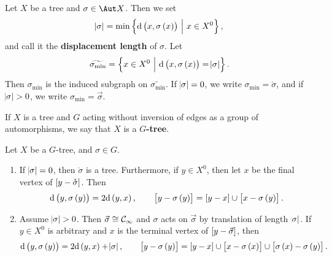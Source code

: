 \pagebreak

\begin{definition}
Let $ X $ be a tree and $ \sigma \in \Aut X $. Then we set
$$ \abs{\sigma} = \min\cbr{\d\br{x, \sigma\br{x}} \st x \in X^0}, $$
and call it the \textbf{displacement length} of $ \sigma $. Let
$$ \widetilde{\sigma_{\min}} = \cbr{x \in X^0 \st \d\br{x, \sigma\br{x}} = \abs{\sigma}}. $$
Then $ \sigma_{\min} $ is the induced subgraph on $ \widetilde{\sigma_{\min}} $. If $ \abs{\sigma} = 0 $, we write $ \sigma_{\min} = \mathring{\sigma} $, and if $ \abs{\sigma} > 0 $, we write $ \sigma_{\min} = \vec{\sigma} $.
\end{definition}


\begin{definition}
If $ X $ is a tree and $ G $ acting without inversion of edges as a group of automorphisms, we say that $ X $ is a \textbf{$ G $-tree}.
\end{definition}

\begin{proposition}
Let $ X $ be a $ G $-tree, and $ \sigma \in G $.
\begin{enumerate}
\item If $ \abs{\sigma} = 0 $, then $ \mathring{\sigma} $ is a tree. Furthermore, if $ y \in X^0 $, then let $ x $ be the final vertex of $ \sbr{y - \mathring{\sigma}} $. Then
$$ \d\br{y, \sigma\br{y}} = 2\d\br{y, x}, \qquad \sbr{y - \sigma\br{y}} = \sbr{y - x} \cup \sbr{x - \sigma\br{y}}. $$
\item Assume $ \abs{\sigma} > 0 $. Then $ \vec{\sigma} \cong \mathcal{C}_\infty $ and $ \sigma $ acts on $ \vec{\sigma} $ by translation of length $ \abs{\sigma} $. If $ y \in X^0 $ is arbitrary and $ x $ is the terminal vertex of $ \sbr{y - \vec{\sigma}} $, then
$$ \d\br{y, \sigma\br{y}} = 2\d\br{y, x} + \abs{\sigma}, \qquad \sbr{y - \sigma\br{y}} = \sbr{y - x} \cup \sbr{x - \sigma\br{x}} \cup \sbr{\sigma\br{x} - \sigma\br{y}}. $$
\end{enumerate}
\end{proposition}

